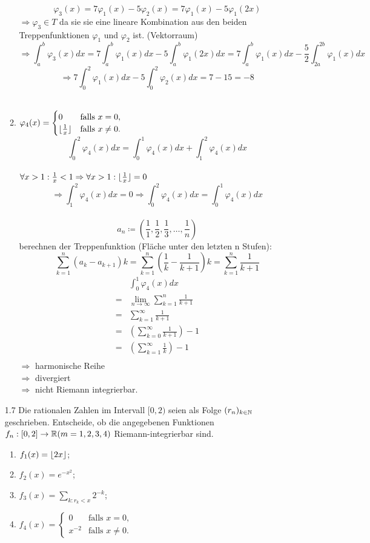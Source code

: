 \documentclass{HM}
\begin{document}
\begin{enumerate}
\begin{enumerate}
				$$\varphi_3(x)=7\varphi_1(x)-5\varphi_2(x)=7\varphi_1(x)-5\varphi_1(2x)$$
				$\Rightarrow \varphi_3\in T$ da sie sie eine lineare Kombination aus den beiden Treppenfunktionen $\varphi_1$ und $\varphi_2$ ist. (Vektorraum)
				$$\Rightarrow \int_a^b\varphi_3(x)dx=
				7\int_a^b\varphi_1(x)dx-5\int_a^b\varphi_1(2x)dx=
				7\int_a^b\varphi_1(x)dx-\frac{5}{2}\int_{2a}^{2b}\varphi_1(x)dx$$
				$$\Rightarrow 7\int_0^2\varphi_1(x)dx-5\int_0^2\varphi_2(x)dx=7-15=-8$$\\
			\item $\varphi_4(x)=\begin{cases}
				0&\text{falls }x=0,\\
				\lfloor\frac{1}{x}\rfloor&\text{falls }x\neq 0.			
			\end{cases}$
			$$\int_0^2\varphi_4(x)dx=\int_0^1\varphi_4(x)dx+\int_1^2\varphi_4(x)dx$$\\
			$\forall x>1:\frac{1}{x}<1\Rightarrow\forall x>1:\lfloor\frac{1}{x}\rfloor=0$
			$$\Rightarrow\int_1^2\varphi_4(x)dx=0\Rightarrow\int_0^2\varphi_4(x)dx=\int_0^1\varphi_4(x)dx$$\\
			$$a_n\coloneqq\left(\frac{1}{1},\frac{1}{2},\frac{1}{3},\hdots,\frac{1}{n}\right)$$
			berechnen der Treppenfunktion (Fläche unter den letzten n Stufen): $$\sum_{k=1}^n(a_k-a_{k+1})k=\sum_{k=1}^n(\frac{1}{k}-\frac{1}{k+1})k=\sum_{k=1}^n\frac{1}{k+1}$$
			\begin{align*}
				&\int_0^1\varphi_4(x)dx\\
				=&\lim\limits_{n\to\infty}\sum_{k=1}^n\frac{1}{k+1}\\
				=&\sum\limits_{k=1}^\infty\frac{1}{k+1}\\
				=&\left(\sum\limits_{k=0}^\infty\frac{1}{k+1}\right)-1\\
				=&\left(\sum\limits_{k=1}^\infty\frac{1}{k}\right)-1\\
			\end{align*}
			$\Rightarrow$ harmonische Reihe\\
			$\Rightarrow$ divergiert\\
			$\Rightarrow$ nicht Riemann integrierbar.
		\end{enumerate}
		
		\item[1.7] Die rationalen Zahlen im Intervall $[0,2)$ seien als Folge $(r_n)_{k\in\mathbb{N}}$ geschrieben. Entscheide, ob die angegebenen Funktionen $f_n:[0,2]\to\mathbb{R}(m=1,2,3,4)$ Riemann-integrierbar sind.
		\begin{enumerate}
			\item $f_1(x)=\lfloor2x\rfloor$;
			\item $f_2(x)=e^{-x^{2}}$;
			\item $f_3(x)=\sum\limits_{k:r_k<x}2^{-k}$;
			\item $f_4(x)=\begin{cases}
				0&\text{falls }x=0,\\
				x^{-2}&\text{falls }x\neq 0.			
			\end{cases}$
		\end{enumerate}
		

\end{enumerate}
\end{document}
